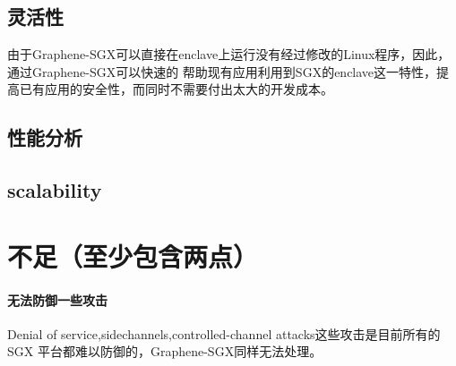 \documentclass{article}
\begin{document}
\subsection{灵活性}
由于Graphene-SGX可以直接在enclave上运行没有经过修改的Linux程序，因此，通过Graphene-SGX可以快速的
帮助现有应用利用到SGX的enclave这一特性，提高已有应用的安全性，而同时不需要付出太大的开发成本。


\subsection{性能分析}


\subsection{scalability}


\section{不足（至少包含两点）}
\paragraph{无法防御一些攻击}
Denial of service,sidechannels,controlled-channel attacks这些攻击是目前所有的 SGX 平台都难以防御的，Graphene-SGX同样无法处理。

\end{document}
